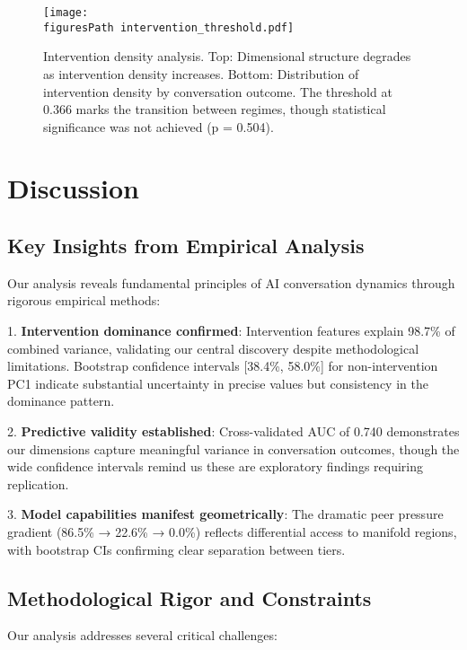 \documentclass[11pt,letterpaper]{article}
\newcommand{\allFeaturesPCOne}{98.7\%}  %
\newcommand{\nonInterventionPCOneCILower}{38.4\%}
\newcommand{\nonInterventionPCOneCIUpper}{58.0\%}
\newcommand{\testAUC}{0.740}
\newcommand{\interventionThreshold}{0.366}
\newcommand{\interventionThresholdPValue}{0.504}
\newcommand{\fullReasoningPeerPressure}{86.5\%}
\newcommand{\lightReasoningPeerPressure}{22.6\%}
\newcommand{\nonReasoningPeerPressure}{0.0\%}
\newcommand{\figuresPath}{../analysis/rigorous_analysis_outputs/figures/}
\begin{document}
\begin{figure}[htbp]
\centering
\texttt{[image: \\figuresPath intervention\_threshold.pdf]}
\caption{Intervention density analysis. Top: Dimensional structure degrades as intervention density increases. Bottom: Distribution of intervention density by conversation outcome. The threshold at \interventionThreshold{} marks the transition between regimes, though statistical significance was not achieved (p = \interventionThresholdPValue{}).}
\label{fig:intervention_threshold}
\end{figure}

\section{Discussion}

\subsection{Key Insights from Empirical Analysis}

Our analysis reveals fundamental principles of AI conversation dynamics through rigorous empirical methods:

1. \textbf{Intervention dominance confirmed}: Intervention features explain \allFeaturesPCOne{} of combined variance, validating our central discovery despite methodological limitations. Bootstrap confidence intervals [\nonInterventionPCOneCILower{}, \nonInterventionPCOneCIUpper{}] for non-intervention PC1 indicate substantial uncertainty in precise values but consistency in the dominance pattern.

2. \textbf{Predictive validity established}: Cross-validated AUC of \testAUC{} demonstrates our dimensions capture meaningful variance in conversation outcomes, though the wide confidence intervals remind us these are exploratory findings requiring replication.

3. \textbf{Model capabilities manifest geometrically}: The dramatic peer pressure gradient (\fullReasoningPeerPressure{} → \lightReasoningPeerPressure{} → \nonReasoningPeerPressure{}) reflects differential access to manifold regions, with bootstrap CIs confirming clear separation between tiers.

\subsection{Methodological Rigor and Constraints}

Our analysis addresses several critical challenges:
\end{document}
